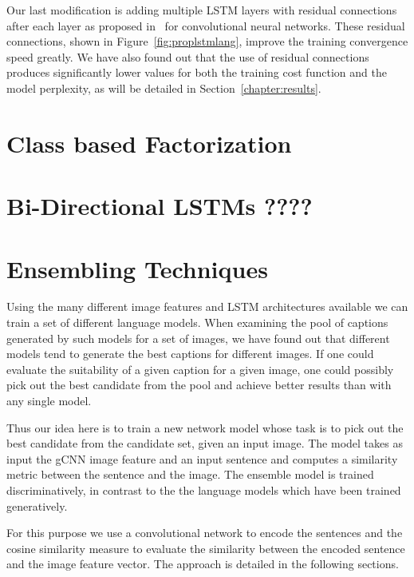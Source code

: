 Our last modification is adding multiple LSTM layers with residual connections
after each layer as proposed in~\cite{He2015} for convolutional neural networks.
These residual connections, shown in Figure~\ref{fig:proplstmlang}, improve
the training convergence speed greatly.
We have also found out that the use of residual connections produces
significantly lower values for both the training cost function and the model
perplexity, as will be detailed in Section~\ref{chapter:results}.

\section{Class based Factorization}
\section{Bi-Directional LSTMs ????}
\section{Ensembling Techniques}
Using the many different image features and LSTM architectures available we can
train a set of different language models.
When examining the pool of captions generated by such models for a set of
images, we have found out that different models tend to generate the best
captions for different images.
If one could evaluate the suitability of a given caption for a given image, one
could possibly pick out the best candidate from the pool and achieve better
results than with any single model.

Thus our idea here is to train a new network model whose task is to pick out the
best candidate from the candidate set, given an input image. 
The model takes as input the gCNN image feature and an input sentence and
computes a similarity metric between the sentence and the image. 
The ensemble model is trained discriminatively, in contrast to the the language
models which have been trained generatively.

For this purpose we use a convolutional network to encode the sentences and the
cosine similarity measure to evaluate the similarity between the encoded
sentence and the image feature vector. 
The approach is detailed in the following sections.

